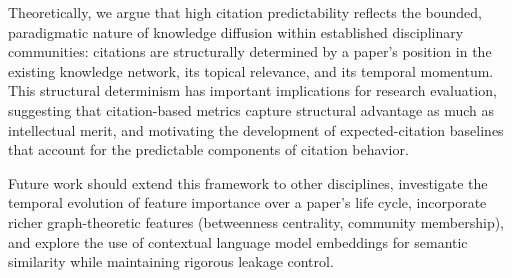 \documentclass[12pt,a4paper]{article}
\begin{document}
Theoretically, we argue that high citation predictability reflects the bounded,
paradigmatic nature of knowledge diffusion within established disciplinary
communities: citations are structurally determined by a paper's position in the
existing knowledge network, its topical relevance, and its temporal momentum.
This structural determinism has important implications for research evaluation,
suggesting that citation-based metrics capture structural advantage as much as
intellectual merit, and motivating the development of expected-citation baselines
that account for the predictable components of citation behavior.

Future work should extend this framework to other disciplines, investigate the
temporal evolution of feature importance over a paper's life cycle, incorporate
richer graph-theoretic features (betweenness centrality, community membership),
and explore the use of contextual language model embeddings for semantic similarity
while maintaining rigorous leakage control.

\newpage


\end{document}
